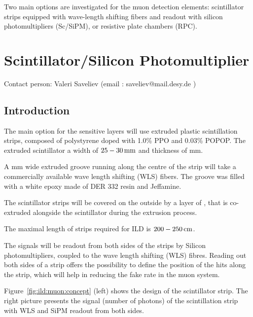 Two main options are investigated for the muon detection elements: scintillator strips equipped with wave-length shifting fibers and readout with silicon photomultipliers (Sc/SiPM), or resistive plate chambers (RPC).

\section{Scintillator/Silicon Photomultiplier}
Contact person: Valeri Saveliev (email : saveliev@mail.desy.de )

\subsection{Introduction}
The main option for the sensitive layers will use extruded plastic scintillation strips, composed of polystyrene doped with 1.0\% PPO and 0.03\% POPOP.
The extruded scintillator a width of $\unit[25-30]{mm}$ and thickness of \unit[7-10]{mm}.

A \unit[1]{mm} wide extruded groove running along the centre of the strip will take a commercially available wave length shifting (WLS) fibers.
The groove was filled with a white epoxy made of DER 332 resin and Jeffamine.

The scintillator strips will be covered on the outside by a layer of , that is co-extruded alongside the scintillator during the extrusion process.

The maximal length of strips required for ILD is $\unit[200-250]{cm}$.

The signals will be readout from both sides of the strips by Silicon photomultipliers, coupled to the wave length shifting (WLS) fibres.
Reading out both sides of a strip offers the possibility to define the position of the hits along the strip, which will help in reducing the fake rate in the muon system.

Figure~\ref{fig:ild:muon:concept} (left) shows the design of the scintillator strip. The right picture presents the signal (number of photons) of the scintillation strip with WLS and SiPM readout from both sides.

